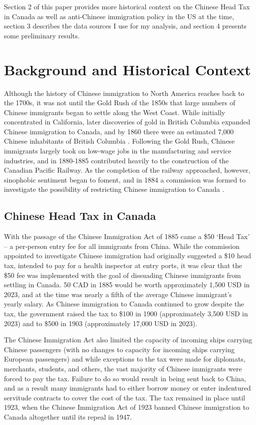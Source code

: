 \documentclass[12pt]{article}
\begin{document}
Section 2 of this paper provides more historical context on the Chinese Head Tax in Canada as well as anti-Chinese immigration policy in the US at the time, section 3 describes the data sources I use for my analysis, and section 4 presents some preliminary results.


\section{Background and Historical Context}
Although the history of Chinese immigration to North America reaches back to the 1700s, it was not until the Gold Rush of the 1850s that large numbers of Chinese immigrants began to settle along the West Coast. 
While initially concentrated in California, later discoveries of gold in British Columbia expanded Chinese immigration to Canada, and by 1860 there were an estimated 7,000 Chinese inhabitants of British Columbia \citep{chan2019}.
Following the Gold Rush, Chinese immigrants largely took on low-wage jobs in the manufacturing and service industries, and in 1880-1885 contributed heavily to the construction of the Canadian Pacific Railway.
As the completion of the railway approached, however, sinophobic sentiment began to foment, and in 1884 a commission was formed to investigate the possibility of restricting Chinese immigration to Canada \citep{chan2016}.

\subsection{Chinese Head Tax in Canada}
With the passage of the Chinese Immigration Act of 1885 came a \$50 `Head Tax' -- a per-person entry fee for all immigrants from China. While the commission appointed to investigate Chinese immigration had originally suggested a \$10 head tax, intended to pay for a health inspector at entry ports,
it was clear that the \$50 fee was implemented with the goal of dissuading Chinese immigrants from settling in Canada. 50 CAD in 1885 would be worth approximately 1,500 USD in 2023, and at the time was nearly a fifth of the average Chinese immigrant's yearly salary.
As Chinese immigration to Canada continued to grow despite the tax, the government raised the tax to \$100 in 1900 (approximately 3,500 USD in 2023) and to \$500 in 1903 (approximately 17,000 USD in 2023). 

The Chinese Immigration Act also limited the capacity of incoming ships carrying Chinese passengers (with no changes to capacity for incoming ships carrying European passengers) and while exceptions to the tax were made for diplomats, merchants, students, and others, the vast majority of Chinese immigrants were forced to pay the tax. 
Failure to do so would result in being sent back to China, and as a result many immigrants had to either borrow money or enter indentured servitude contracts to cover the cost of the tax. 
The tax remained in place until 1923, when the Chinese Immigration Act of 1923 banned Chinese immigration to Canada altogether until its repeal in 1947.
\end{document}
